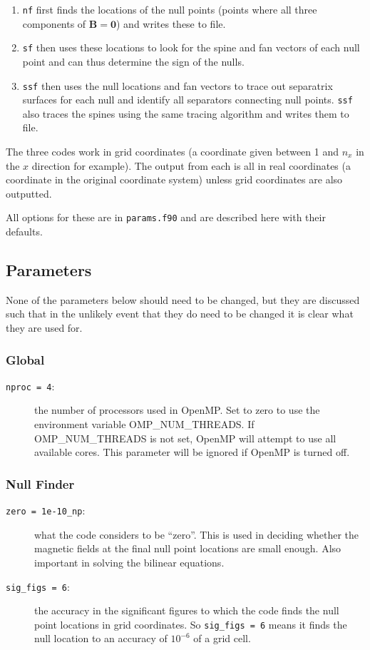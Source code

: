 \documentclass[12pt]{article}
\renewcommand{\vec}[1]{\mathbf{#1}}
\begin{document}
    \begin{enumerate}
      \item \texttt{nf} first finds the locations of the null points (points where all three components of \( \vec{B} = \vec{0} \)) and writes these to file.
      \item \texttt{sf} then uses these locations to look for the spine and fan vectors of each null point and can thus determine the sign of the nulls.
      \item \texttt{ssf} then uses the null locations and fan vectors to trace out separatrix surfaces for each null and identify all separators connecting null points. \texttt{ssf} also traces the spines using the same tracing algorithm and writes them to file.
    \end{enumerate}
    The three codes work in grid coordinates (a coordinate given between 1 and \( n_x \) in the \( x \) direction for example). The output from each is all in real coordinates (a coordinate in the original coordinate system) unless grid coordinates are also outputted.

    All options for these are in \texttt{params.f90} and are described here with their defaults.

    \subsection{Parameters}
      \label{sec:params}

      None of the parameters below should need to be changed, but they are discussed such that in the unlikely event that they do need to be changed it is clear what they are used for.

      \subsubsection{Global}
        \begin{description}
          \item [\texttt{nproc = 4}:] the number of processors used in OpenMP. Set to zero to use the environment variable OMP\_NUM\_THREADS. If OMP\_NUM\_THREADS is not set, OpenMP will attempt to use all available cores. This parameter will be ignored if OpenMP is turned off.
        \end{description}

      \subsubsection{Null Finder}
        \begin{description}
          \item [\texttt{zero = 1e-10\_np}:] what the code considers to be ``zero''. This is used in deciding whether the magnetic fields at the final null point locations are small enough. Also important in solving the bilinear equations.
          \item [\texttt{sig\_figs = 6}:] the accuracy in the significant figures to which the code finds the null point locations in grid coordinates. So \texttt{sig\_figs = 6} means it finds the null location to an accuracy of \( 10^{-6} \) of a grid cell.
        \end{description}
\end{document}
